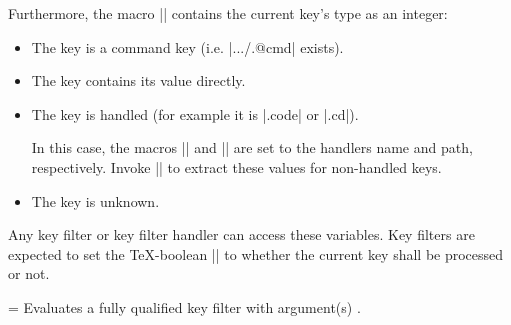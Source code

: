 	Furthermore, the macro |\pgfkeyscasenumber| contains the current key's type as an integer:
\begin{itemize}
\item[\meta{1}] The key is a command key (i.e. |.../.@cmd| exists).
\item[\meta{2}] The key contains its value directly.
\item[\meta{3}] The key is handled (for example it is |.code| or |.cd|).

In this case, the macros |\pgfkeyscurrentname| and |\pgfkeyscurrentpath| are set to the handlers name and path, respectively.
Invoke |\pgfkeyssplitpath{}| to extract these values for non-handled keys. 
\item[\meta{0}] The key is unknown.
\end{itemize}
	Any key filter or key filter handler can access these variables. Key filters are expected to set the \TeX-boolean |\ifpgfkeysfiltercontinue| to whether the current key shall be processed or not.

\begin{command}{\pgfkeysevalkeyfilterwith{}=}
	Evaluates a fully qualified key filter  with argument(s) .
\begin{codeexample}
\end{codeexample}
\end{command}
\endgroup
